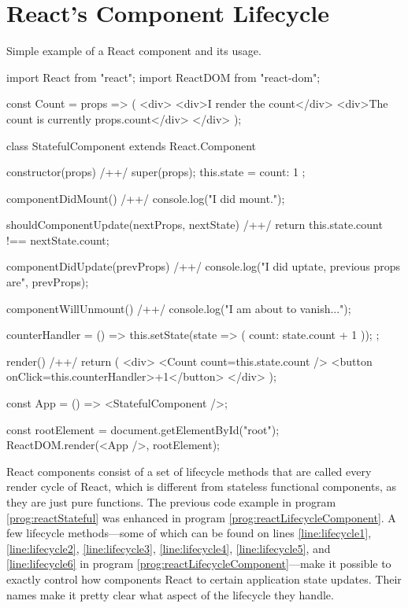 \section{React's Component Lifecycle}

\begin{program}
\caption{Simple example of a React component and its usage.} 
\label{prog:reactLifecycleComponent}
\begin{JsCode}
import React from "react";
import ReactDOM from "react-dom";

const Count = props => (
  <div>
    <div>I render the count</div>
    <div>The count is currently {props.count}</div>
  </div>
);

class StatefulComponent extends React.Component {
  constructor(props) { /+\label{line:lifecycle1}+/
    super(props);
    this.state = {
      count: 1
    };
  }

  componentDidMount() { /+\label{line:lifecycle2}+/
    console.log("I did mount.");
  }

  shouldComponentUpdate(nextProps, nextState) { /+\label{line:lifecycle3}+/
    return this.state.count !== nextState.count;
  }

  componentDidUpdate(prevProps) { /+\label{line:lifecycle4}+/
    console.log("I did uptate, previous props are", prevProps);
  }

  componentWillUnmount() { /+\label{line:lifecycle5}+/
    console.log("I am about to vanish...");
  }

  counterHandler = () => {
    this.setState(state => ({ count: state.count + 1 }));
  };

  render() { /+\label{line:lifecycle6}+/
    return (
      <div>
        <Count count={this.state.count} />
        <button onClick={this.counterHandler}>+1</button>
      </div>
    );
  }
}
  
const App = () => <StatefulComponent />;

const rootElement = document.getElementById("root");
ReactDOM.render(<App />, rootElement);  
\end{JsCode}
\end{program}

React components consist of a set of lifecycle methods that are called every render cycle of React, which is different from stateless functional components, as they are just pure functions. The previous code example in program \ref{prog:reactStateful} was enhanced in program \ref{prog:reactLifecycleComponent}. A few lifecycle methods---some of which can be found on lines \ref{line:lifecycle1}, \ref{line:lifecycle2}, \ref{line:lifecycle3}, \ref{line:lifecycle4}, \ref{line:lifecycle5}, and \ref{line:lifecycle6} in program \ref{prog:reactLifecycleComponent}---make it possible to exactly control how components React to certain application state updates. Their names make it pretty clear what aspect of the lifecycle they handle.


